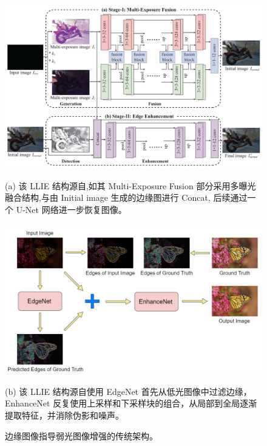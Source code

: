 \documentclass[CJK,aspectratio=169]{beamer}  %
\begin{document}
	\begin{frame}
		\begin{figure}
			\centering
			\setlength{\abovecaptionskip}{-0.05cm}
			\begin{minipage}{0.45\columnwidth}
				\includegraphics[width=\linewidth]{picture/LLIE/EEMEFN/EEMEFN framework}
				\caption*{\tiny
					(a) 该 LLIE 结构源自\cite{zhu2020eemefn},如其 Multi-Exposure Fusion 部分采用多曝光融合结构,与由 Initial image 生成的边缘图进行 Concat, 后续通过一个 U-Net 网络进一步恢复图像。}
			\end{minipage}
			\begin{minipage}{0.45\columnwidth}
				\setlength{\abovecaptionskip}{0.29cm}
				\includegraphics[width=\linewidth]{picture/LLIE/EdgeNet/Archtecture workflow}
				\caption*{\tiny
					(b) 该 LLIE 结构源自\cite{rana2021edge}使用 EdgeNet 首先从低光图像中过滤边缘，EnhanceNet 反复使用上采样和下采样块的组合，从局部到全局逐渐提取特征，并消除伪影和噪声。}
			\end{minipage}
			\caption{\tiny 边缘图像指导弱光图像增强的传统架构。}
		\end{figure}
		

\end{frame}
\end{document}

